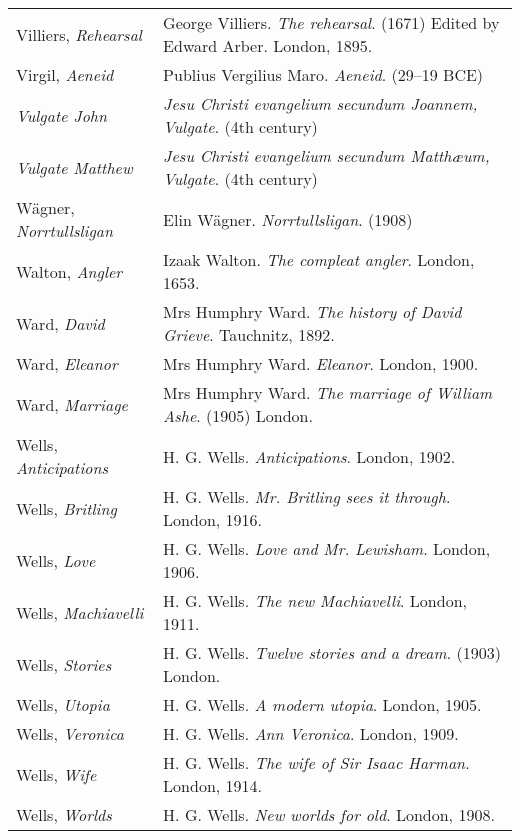 \begin{longtable}{p{} p{}}
Villiers, \textit{Rehearsal} & George Villiers. \textit{The rehearsal}. (1671) Edited by Edward Arber. London, 1895. \\

Virgil, \textit{Aeneid} & Publius Vergilius Maro. \textit{Aeneid}. (29--19 BCE)\\
%

\textit{Vulgate John} & \textit{Jesu Christi evangelium secundum Joannem, Vulgate}. (4th century) \\
\textit{Vulgate Matthew} & \textit{Jesu Christi evangelium secundum Matthæum, Vulgate}. (4th century) \\

Wägner, \textit{Norrtullsligan} & Elin Wägner. \textit{Norrtullsligan}. (1908) \\

Walton, \textit{Angler} & Izaak Walton. \textit{The compleat angler}. London, 1653. \\

Ward, \textit{David} & Mrs Humphry Ward. \textit{The history of David Grieve}. Tauchnitz, 1892. \\
Ward, \textit{Eleanor} & Mrs Humphry Ward. \textit{Eleanor}. London, 1900. \\
Ward, \textit{Marriage} & Mrs Humphry Ward. \textit{The marriage of William Ashe}. (1905) London. \\

Wells, \textit{Anticipations} & H. G. Wells. \textit{Anticipations}. London, 1902. \\
Wells, \textit{Britling} & H. G. Wells. \textit{Mr. Britling sees it through}. London, 1916. \\
Wells, \textit{Love} & H. G. Wells. \textit{Love and Mr. Lewisham}. London, 1906. \\
Wells, \textit{Machiavelli} & H. G. Wells. \textit{The new Machiavelli}. London, 1911. \\
Wells, \textit{Stories} & H. G. Wells. \textit{Twelve stories and a dream}. (1903) London. \\
Wells, \textit{Utopia} & H. G. Wells. \textit{A modern utopia}. London, 1905. \\
Wells, \textit{Veronica} & H. G. Wells. \textit{Ann Veronica}. London, 1909. \\
Wells, \textit{Wife} & H. G. Wells. \textit{The wife of Sir Isaac Harman}. London, 1914. \\
Wells, \textit{Worlds} & H. G. Wells. \textit{New worlds for old}. London, 1908. \\


\end{longtable}
